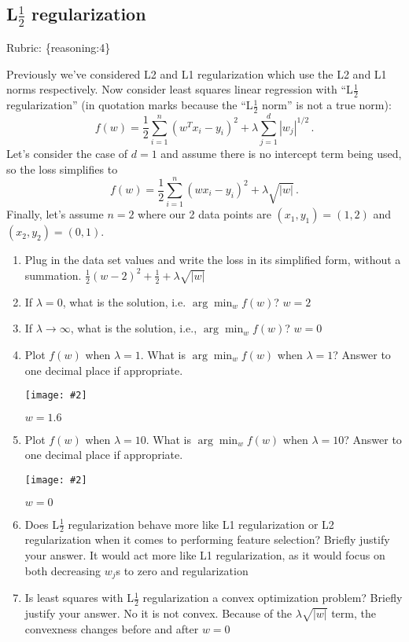 \documentclass{article}
\def\rubric#1{\gre{Rubric: \{#1\}}}{}
\def\gre#1{{\color{gre}#1}}
\def\red#1{{\color{red}#1}}
\newcommand{\centerfig}[2]{\begin{center}\texttt{[image: \#2]}\end{center}}
\begin{document}
\subsection{L$\frac12$ regularization}
\rubric{reasoning:4}

Previously we've considered L2 and L1 regularization which use the L2 and L1 norms respectively. Now consider
least squares linear regression with ``L$\frac12$ regularization'' (in quotation marks because the ``L$\frac12$ norm'' is not a true norm):
\[
f(w) = \frac{1}{2} \sum_{i=1}^n (w^Tx_i - y_i)^2 + \lambda \sum_{j=1}^d |w_j|^{1/2} \, .
\]
Let's consider the case of $d=1$ and
assume  there is no intercept term being used, so the loss simplifies to
\[
f(w) = \frac{1}{2} \sum_{i=1}^n (wx_i - y_i)^2 + \lambda \sqrt{|w|} \, .
\]
Finally, let's assume $n=2$
where our 2 data points are $(x_1,y_1)=(1,2)$ and $(x_2,y_2)=(0,1)$. 

\begin{enumerate}
\item Plug in the data set values and write the loss in its simplified form, without a summation.
\red{$\frac{1}{2}(w-2)^{2}+\frac{1}{2} + \lambda\sqrt{|w|}$}
\item If $\lambda=0$, what is the solution, i.e. $\arg \min_w f(w)$? \red{$w=2$}
\item If $\lambda\rightarrow \infty$, what is the solution, i.e., $\arg \min_w f(w)$? \red{$w=0$}
\item Plot $f(w)$ when $\lambda = 1$. What is $\arg \min_w f(w)$ when $\lambda=1$? Answer to one decimal place if appropriate.    
\centerfig{.7}{./figs/lambdaIs1.png}
\red{$w=1.6$}
\item Plot $f(w)$ when $\lambda = 10$. What is $\arg \min_w f(w)$ when $\lambda=10$? Answer to one decimal place if appropriate. 
\centerfig{.7}{./figs/lambdaIs10.png}
\red{$w=0$}
\item Does L$\frac12$ regularization behave more like L1 regularization or L2 regularization
when it comes to performing feature selection? Briefly justify your answer. \red{It would act more like L1 regularization, as it would focus on both decreasing $w_j$s to zero and regularization}
\item Is least squares with L$\frac12$ regularization a convex optimization problem? Briefly justify your answer. \red{No it is not convex. Because of the $\lambda \sqrt{|w|}$ term, the convexness changes before and after $w = 0$}
\end{enumerate}
\end{document}
